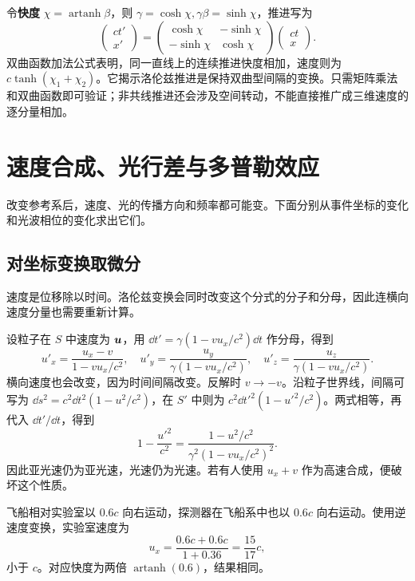 \begin{modernbox}[title={进一步探索：快度把同向速度合成变成加法}]
令\textbf{快度} $\chi=\operatorname{artanh}\beta$，则 $\gamma=\cosh\chi,\gamma\beta=\sinh\chi$，推进写为
\[
\begin{pmatrix}ct'\\x'\end{pmatrix}
=\begin{pmatrix}\cosh\chi&-\sinh\chi\\-\sinh\chi&\cosh\chi\end{pmatrix}
\begin{pmatrix}ct\\x\end{pmatrix}.
\]
双曲函数加法公式表明，同一直线上的连续推进快度相加，速度则为 $c\tanh(\chi_1+\chi_2)$。它揭示洛伦兹推进是保持双曲型间隔的变换。只需矩阵乘法和双曲函数即可验证；非共线推进还会涉及空间转动，不能直接推广成三维速度的逐分量相加。
\end{modernbox}

\section{速度合成、光行差与多普勒效应}
改变参考系后，速度、光的传播方向和频率都可能变。下面分别从事件坐标的变化和光波相位的变化求出它们。

\subsection{对坐标变换取微分}
速度是位移除以时间。洛伦兹变换会同时改变这个分式的分子和分母，因此连横向速度分量也需要重新计算。

设粒子在 $S$ 中速度为 $\boldsymbol{u}$，用 $\dd t'=\gamma(1-vu_x/c^2)\dd t$ 作分母，得到
\begin{equation}\label{eq:sr-velocity}
\boxed{u'_x=\frac{u_x-v}{1-vu_x/c^2},\quad
u'_y=\frac{u_y}{\gamma(1-vu_x/c^2)},\quad
u'_z=\frac{u_z}{\gamma(1-vu_x/c^2)}.}
\end{equation}
横向速度也会改变，因为时间间隔改变。反解时 $v\to-v$。沿粒子世界线，间隔可写为 $\dd s^2=c^2\dd t^2(1-u^2/c^2)$，在 $S'$ 中则为 $c^2\dd t'^2(1-u'^2/c^2)$。两式相等，再代入 $\dd t'/\dd t$，得到
\[
1-\frac{u'^2}{c^2}=\frac{1-u^2/c^2}{\gamma^2(1-vu_x/c^2)^2}.
\]
因此亚光速仍为亚光速，光速仍为光速。若有人使用 $u_x+v$ 作为高速合成，便破坏这个性质。
\begin{example}[飞船发射探测器]
飞船相对实验室以 $0.6c$ 向右运动，探测器在飞船系中也以 $0.6c$ 向右运动。使用逆速度变换，实验室速度为
\[
u_x=\frac{0.6c+0.6c}{1+0.36}=\frac{15}{17}c,
\]
小于 $c$。对应快度为两倍 $\operatorname{artanh}(0.6)$，结果相同。
\end{example}

